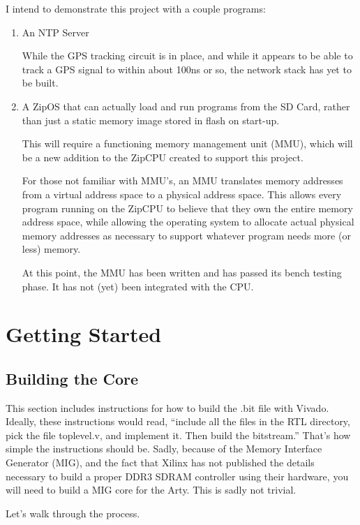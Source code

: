 \documentclass{gqtekspec}
\begin{document}
I intend to demonstrate this project with a couple programs:
\begin{enumerate}
\item An NTP Server

	While the GPS tracking circuit is in place, and while it appears to be
	able to track a GPS signal to within about 100ns or so, the 
	network stack has yet to be built.

\item A ZipOS that can actually load and run programs from the SD Card, rather
	than just a static memory image stored in flash on start-up.

	This will require a functioning memory management unit (MMU), which
	will be a new addition to the ZipCPU created to support this project.

	For those not familiar with MMU's, an MMU translates memory addresses
	from a virtual address space to a physical address space.  This allows
	every program running on the ZipCPU to believe that they own the entire
	memory address space, while allowing the operating system to allocate
	actual physical memory addresses as necessary to support whatever
	program needs more (or less) memory.

	At this point, the MMU has been written and has passed its bench
	testing phase.  It has not (yet) been integrated with the CPU.
\end{enumerate}


\chapter{Getting Started}\label{ch:getting-started}
\section{Building the Core}
This section includes instructions for how to build the .bit file with Vivado.
Ideally, these instructions would read, ``include all the files in the RTL
directory, pick the file toplevel.v, and implement it.  Then build the
bitstream.''  That's how simple the instructions should be.  Sadly, because of
the Memory Interface Generator (MIG), and the fact that Xilinx has not published
the details necessary to build a proper DDR3 SDRAM controller using their
hardware, you will need to build a MIG core for the Arty.  This is sadly not
trivial.

Let's walk through the process.
\end{document}
